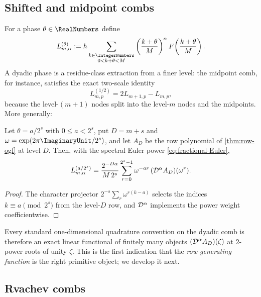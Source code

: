 \subsection{Shifted and midpoint combs}

For a phase $\theta\in\RealNumbers$ define
\begin{equation}
 L_{m,\alpha}^{(\theta)}
 :=h\sum_{\substack{k\in\IntegerNumbers\\0<k+\theta<M}}
 \left(\frac{k+\theta}{M}\right)^{\alpha}
 F\!\left(\frac{k+\theta}{M}\right).
 \label{eq:shifted-comb}
\end{equation}
A dyadic phase is a residue-class extraction from a finer level: the
midpoint comb, for instance, satisfies the exact two-scale identity
\begin{equation}
 L^{(1/2)}_{m,p}
 =2L_{m+1,p}-L_{m,p},
 \label{eq:midpoint}
\end{equation}
because the level-$(m{+}1)$ nodes split into the level-$m$ nodes and
the midpoints.  More generally:

\begin{proposition}
\label{prop:roots-of-unity}
Let $\theta=a/2^{s}$ with $0\le a<2^{s}$, put $D=m+s$ and
$\omega=\exp(2\pi\ImaginaryUnit/2^{s})$, and let $A_D$ be the row polynomial of
\cref{thm:row-ogf} at level $D$.  Then, with the spectral Euler power
\eqref{eq:fractional-Euler},
\begin{equation}
 L_{m,\alpha}^{(a/2^{s})}
 =\frac{2^{-D\alpha}}{M\,2^{s}}
 \sum_{r=0}^{2^{s}-1}\omega^{-ar}\,
 (\mathcal D^{\alpha}A_D)(\omega^{r}).
 \label{eq:root-filter}
\end{equation}
\end{proposition}

\begin{proof}
The character projector $2^{-s}\sum_r\omega^{r(k-a)}$ selects the
indices $k\equiv a\pmod{2^{s}}$ from the level-$D$ row, and
$\mathcal D^\alpha$ implements the power weight coefficientwise.
\end{proof}

Every standard one-dimensional quadrature convention on the dyadic comb
is therefore an exact linear functional of finitely many objects
$(\mathcal D^{\alpha}A_D)(\zeta)$ at $2$-power roots of unity $\zeta$.  This
is the first indication that the \emph{row generating function} is the
right primitive object; we develop it next.

\subsection{Rvachev combs}

